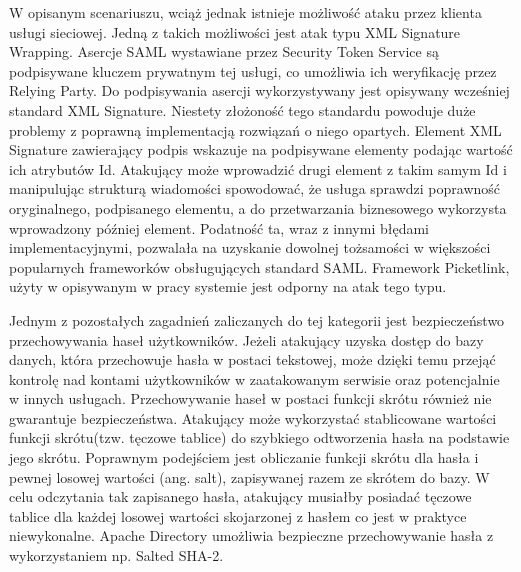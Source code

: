 	W opisanym scenariuszu, wciąż jednak istnieje możliwość ataku przez klienta usługi sieciowej. Jedną z takich możliwości jest atak typu XML Signature Wrapping. Asercje SAML wystawiane przez Security Token Service są podpisywane kluczem prywatnym tej usługi, co umożliwia ich weryfikację przez Relying Party. Do podpisywania asercji wykorzystywany jest opisywany wcześniej standard XML Signature. Niestety złożoność tego standardu powoduje duże problemy z poprawną implementacją rozwiązań o niego opartych. Element XML Signature zawierający podpis wskazuje na podpisywane elementy podając wartość ich atrybutów Id. Atakujący może wprowadzić drugi element z takim samym Id i manipulując strukturą wiadomości spowodować, że usługa sprawdzi poprawność oryginalnego, podpisanego elementu, a do przetwarzania biznesowego wykorzysta wprowadzony później element. Podatność ta, wraz z innymi błędami implementacyjnymi, pozwalała na uzyskanie dowolnej tożsamości w większości popularnych frameworków obsługujących standard SAML\cite{Somorovsky}. Framework Picketlink, użyty w opisywanym w pracy systemie jest odporny na atak tego typu. 

	Jednym z pozostałych zagadnień zaliczanych do tej kategorii jest bezpieczeństwo przechowywania haseł użytkowników. Jeżeli atakujący uzyska dostęp do bazy danych, która przechowuje hasła w postaci tekstowej, może dzięki temu przejąć kontrolę nad kontami użytkowników w zaatakowanym serwisie oraz potencjalnie w innych usługach.  Przechowywanie haseł w postaci funkcji skrótu również nie gwarantuje bezpieczeństwa. Atakujący może wykorzystać stablicowane wartości funkcji skrótu(tzw. tęczowe tablice) do szybkiego odtworzenia hasła na podstawie jego skrótu. Poprawnym podejściem jest obliczanie funkcji skrótu dla hasła i pewnej losowej wartości (ang. salt), zapisywanej razem ze skrótem do bazy. W celu odczytania tak zapisanego hasła, atakujący musiałby posiadać tęczowe tablice dla każdej losowej wartości skojarzonej z hasłem co jest w praktyce niewykonalne. Apache Directory umożliwia bezpieczne przechowywanie hasła z wykorzystaniem np. Salted SHA-2.
